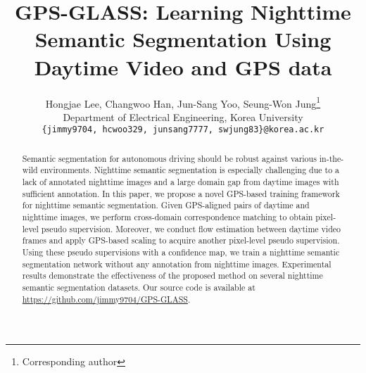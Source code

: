 \documentclass[10pt,twocolumn,letterpaper]{article}
\begin{document}
\title{GPS-GLASS: Learning Nighttime Semantic Segmentation Using Daytime Video and GPS data} 

\author{Hongjae Lee, Changwoo Han, Jun-Sang Yoo, Seung-Won Jung\thanks{Corresponding author}\\
	Department of Electrical Engineering, Korea University\\
	{\tt\small \{jimmy9704, hcwoo329, junsang7777, swjung83\}@korea.ac.kr}
}

\maketitle

\begin{abstract}
    Semantic segmentation for autonomous driving should be robust against various in-the-wild environments. Nighttime semantic segmentation is especially challenging due to a lack of annotated nighttime images and a large domain gap from daytime images with sufficient annotation. In this paper, we propose a novel GPS-based training framework for nighttime semantic segmentation. Given GPS-aligned pairs of daytime and nighttime images, we perform cross-domain correspondence matching to obtain pixel-level pseudo supervision. Moreover, we conduct flow estimation between daytime video frames and apply GPS-based scaling to acquire another pixel-level pseudo supervision. Using these pseudo supervisions with a confidence map, we train a nighttime semantic segmentation network without any annotation from nighttime images. Experimental results demonstrate the effectiveness of the proposed method on several nighttime semantic segmentation datasets. Our source code is available at \url{https://github.com/jimmy9704/GPS-GLASS}.
\end{abstract}
\end{document}
